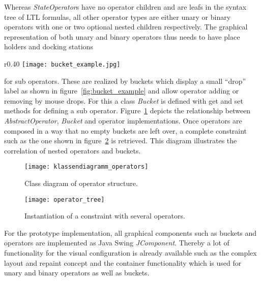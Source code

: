 Whereas \emph{StateOperator}s have no operator children and are leafs in the syntax tree of LTL formulas, all other operator types are either unary or binary operators with one or two optional nested children respectively. 
The graphical representation of both unary and binary operators thus needs to have place holders and docking stations
\begin{wrapfigure}{r}{0.40\textwidth}
  \centering
  \texttt{[image: bucket\_example.jpg]}
  \caption{Buckets for graphical nesting of operators.}
  \label{fig:bucket_example}
\end{wrapfigure}
for sub operators. These are realized by buckets which display a small ``drop'' label as shown in figure~\ref{fig:bucket_example} and allow operator adding or removing by mouse drops.
For this a class \emph{Bucket} is defined with get and set methods for defining a sub operator.
Figure~\ref{fig:klassendiagramm_operators} depicts the relationship between \emph{AbstractOperator}, \emph{Bucket} and operator implementations.
Once operators are composed in a way that no empty buckets are left over, a complete constraint such as the one shown in figure~\ref{fig:operator_tree} is retrieved. This diagram illustrates the correlation of nested operators and buckets.
\begin{figure}[htbp]
  \centering
  \texttt{[image: klassendiagramm\_operators]} 
  \caption{Class diagram of operator structure.}
  \label{fig:klassendiagramm_operators}
\end{figure}

\begin{figure}[htbp]
  \centering
  \texttt{[image: operator\_tree]} 
  \caption{Instantiation of a constraint with several operators.}
  \label{fig:operator_tree}
\end{figure}

For the prototype implementation, all graphical components such as buckets and operators are implemented as Java Swing \emph{JComponent}. Thereby a lot of functionality for the visual configuration is already available such as the complex layout and repaint concept and the container functionality which is used for unary and binary operators as well as buckets.


